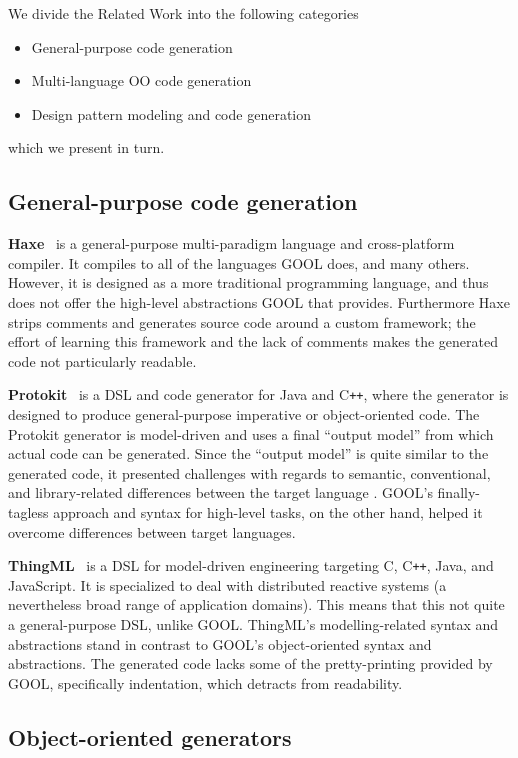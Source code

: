 \documentclass[sigplan,review,anonymous,prologue,dvipsnames]{acmart}
\newcommand{\Cplusplus}{C\texttt{++}}
\begin{document}
We divide the Related Work into the following categories
\begin{itemize}
\item General-purpose code generation
\item Multi-language OO code generation
\item Design pattern modeling and code generation
\end{itemize}
which we present in turn.

\subsection{General-purpose code generation}

\textbf{Haxe}~\cite{Haxe} is a general-purpose multi-paradigm language and cross-platform
compiler.  It compiles to all of the languages GOOL does, and many
others.  However, it is designed as a more traditional programming language, and
thus does not offer the high-level abstractions GOOL that provides. Furthermore
Haxe strips comments and generates source code around a custom framework; 
the effort of learning this framework and the lack of comments makes the generated
code not particularly readable.

\textbf{Protokit}~\cite{kovesdan2017multi} is a DSL and code generator for Java and
\Cplusplus, where the generator is designed to produce
general-purpose imperative or object-oriented code. The Protokit generator is
model-driven and uses a final ``output model'' from which actual code can be
generated. Since the ``output model'' is quite similar to the generated
code, it presented challenges with regards to semantic, conventional, and
library-related differences between the target language
\cite{kovesdan2017multi}. GOOL's finally-tagless approach and syntax for
high-level tasks, on the other hand, helped it overcome differences between
target languages.

\textbf{ThingML}~\cite{harrand2016thingml} is a DSL for model-driven engineering
targeting C, \Cplusplus, Java, and JavaScript. It is specialized to deal with
distributed reactive systems (a nevertheless broad range of application domains).
This means that this not quite a general-purpose DSL, unlike GOOL.
ThingML's modelling-related syntax and abstractions stand in contrast to GOOL's
object-oriented syntax and abstractions. The generated code lacks some of the
pretty-printing provided by GOOL, specifically indentation, which detracts from
readability.

\subsection{Object-oriented generators}
\end{document}
